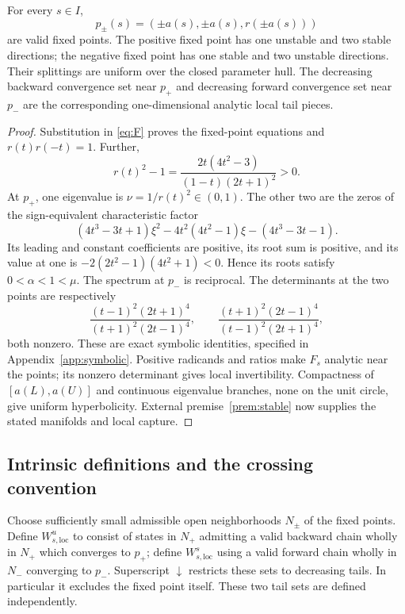 \begin{lemma}\label{lem:tails}
For every \(s\in I\),
\[
 p_\pm(s)=(\pm a(s),\pm a(s),r(\pm a(s)))
\]
are valid fixed points. The positive fixed point has one unstable and two
stable directions; the negative fixed point has one stable and two unstable
directions. Their splittings are uniform over the closed parameter hull.
The decreasing backward convergence set near \(p_+\) and decreasing forward
convergence set near \(p_-\) are the corresponding one-dimensional analytic
local tail pieces.
\end{lemma}
\begin{proof}
Substitution in \eqref{eq:F} proves the fixed-point equations and
\(r(t)r(-t)=1\). Further,
\[
 r(t)^2-1=\frac{2t(4t^2-3)}{(1-t)(2t+1)^2}>0.
\]
At \(p_+\), one eigenvalue is \(\nu=1/r(t)^2\in(0,1)\). The other two
are the zeros of the sign-equivalent characteristic factor
\[
 (4t^3-3t+1)\xi^2-4t^2(4t^2-1)\xi-(4t^3-3t-1).
\]
Its leading and constant coefficients are positive, its root sum is
positive, and its value at one is
\(-2(2t^2-1)(4t^2+1)<0\). Hence its roots satisfy
\(0<\alpha<1<\mu\). The spectrum at \(p_-\) is reciprocal.
The determinants at the two points are respectively
\[
 \frac{(t-1)^2(2t+1)^4}{(t+1)^2(2t-1)^4},\qquad
 \frac{(t+1)^2(2t-1)^4}{(t-1)^2(2t+1)^4},
\]
both nonzero. These are exact symbolic identities, specified in
Appendix~\ref{app:symbolic}. Positive radicands and ratios make \(F_s\)
analytic near the points; its nonzero determinant gives local invertibility.
Compactness of \([a(L),a(U)]\) and continuous eigenvalue branches, none on
the unit circle, give uniform hyperbolicity. External
premise~\ref{prem:stable} now supplies the stated manifolds and local capture.
\end{proof}

\subsection{Intrinsic definitions and the crossing convention}
Choose sufficiently small admissible open neighborhoods \(N_\pm\) of the
fixed points. Define \(W^u_{s,\mathrm{loc}}\) to consist of states in
\(N_+\) admitting a valid backward chain wholly in \(N_+\) which converges
to \(p_+\); define \(W^s_{s,\mathrm{loc}}\) using a valid forward chain
wholly in \(N_-\) converging to \(p_-\). Superscript \(\downarrow\)
restricts these sets to decreasing tails. In particular it excludes the
fixed point itself. These two tail sets are defined independently.

